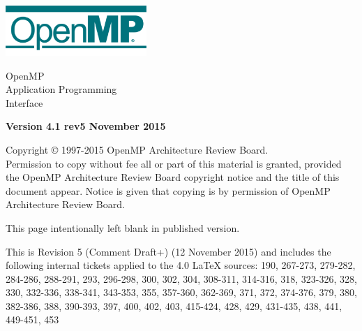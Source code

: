 
  \begin{titlepage}
    \begin{flushleft}
     \hspace{-6em} \includegraphics[width=0.4\textwidth]{openmp-logo.png}
    \end{flushleft}

    \begin{adjustwidth}{-0.75in}{0in}
    \begin{center}
      \Huge
      \textsf{OpenMP\\Application Programming\\Interface}

      \vspace{0.5in}\textsf{    }\vspace{-0.7in}
      \normalsize

      \vspace{1.0in}

      \textbf{Version 4.1 rev5 November 2015}
    \end{center}
    \end{adjustwidth}

    \vspace{3.0in}

\begin{adjustwidth}{0pt}{1em}\setlength{\parskip}{0.25\baselineskip}%
Copyright © 1997-2015 OpenMP Architecture Review Board.\\
Permission to copy without fee all or part of this material is granted,
provided the OpenMP Architecture Review Board copyright notice and
the title of this document appear. Notice is given that copying is by
permission of OpenMP Architecture Review Board.\end{adjustwidth}

  \end{titlepage}


\clearpage
\thispagestyle{empty}
\phantom{a}
This page intentionally left blank in published version.

This is Revision 5 (Comment Draft+) (12 November 2015) and includes the 
following internal tickets applied to the 4.0 LaTeX sources: 
190, 267-273, 279-282, 284-286, 288-291, 293, 296-298, 300, 302, 304, 308-311, 
314-316, 318, 323-326, 328, 330, 332-336, 338-341, 343-353, 355, 357-360, 
362-369, 371, 372, 374-376, 379, 380, 382-386, 388, 390-393, 397, 400, 402,
403, 415-424, 428, 429, 431-435, 438, 441, 449-451, 453


\vfill

